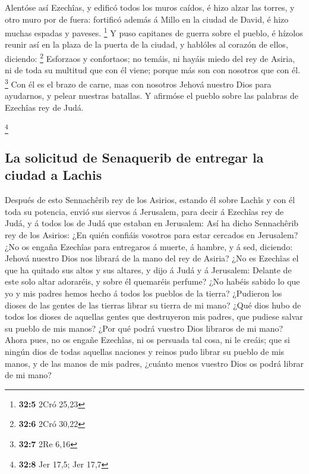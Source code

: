  Alentóse así Ezechîas, y edificó todos los muros caídos,
é hizo alzar las torres, y otro muro por de fuera: fortificó además á
Millo en la ciudad de David, é hizo muchas espadas y paveses.
\footnote{\textbf{32:5} 2Cró 25,23}  Y puso capitanes de
guerra sobre el pueblo, é hízolos reunir así en la plaza de la puerta de
la ciudad, y hablóles al corazón de ellos, diciendo: \footnote{\textbf{32:6}
  2Cró 30,22}  Esforzaos y confortaos; no temáis, ni
hayáis miedo del rey de Asiria, ni de toda su multitud que con él viene;
porque más son con nosotros que con él. \footnote{\textbf{32:7} 2Re 6,16}
 Con él es el brazo de carne, mas con nosotros Jehová
nuestro Dios para ayudarnos, y pelear nuestras batallas. Y afirmóse el
pueblo sobre las palabras de Ezechîas rey de Judá.

\footnote{\textbf{32:8} Jer 17,5; Jer 17,7}

\hypertarget{la-solicitud-de-senaquerib-de-entregar-la-ciudad-a-lachis}{%
\subsection{La solicitud de Senaquerib de entregar la ciudad a
Lachis}\label{la-solicitud-de-senaquerib-de-entregar-la-ciudad-a-lachis}}

 Después de esto Sennachêrib rey de los Asirios, estando
él sobre Lachîs y con él toda su potencia, envió sus siervos á
Jerusalem, para decir á Ezechîas rey de Judá, y á todos los de Judá que
estaban en Jerusalem:  Así ha dicho Sennachêrib rey de
los Asirios: ¿En quién confiáis vosotros para estar cercados en
Jerusalem?  ¿No os engaña Ezechîas para entregaros á
muerte, á hambre, y á sed, diciendo: Jehová nuestro Dios nos librará de
la mano del rey de Asiria?  ¿No es Ezechîas el que ha
quitado sus altos y sus altares, y dijo á Judá y á Jerusalem: Delante de
este solo altar adoraréis, y sobre él quemaréis perfume? 
¿No habéis sabido lo que yo y mis padres hemos hecho á todos los pueblos
de la tierra? ¿Pudieron los dioses de las gentes de las tierras librar
su tierra de mi mano?  ¿Qué dios hubo de todos los dioses
de aquellas gentes que destruyeron mis padres, que pudiese salvar su
pueblo de mis manos? ¿Por qué podrá vuestro Dios libraros de mi mano?
 Ahora pues, no os engañe Ezechîas, ni os persuada tal
cosa, ni le creáis; que si ningún dios de todas aquellas naciones y
reinos pudo librar su pueblo de mis manos, y de las manos de mis padres,
¿cuánto menos vuestro Dios os podrá librar de mi mano?

